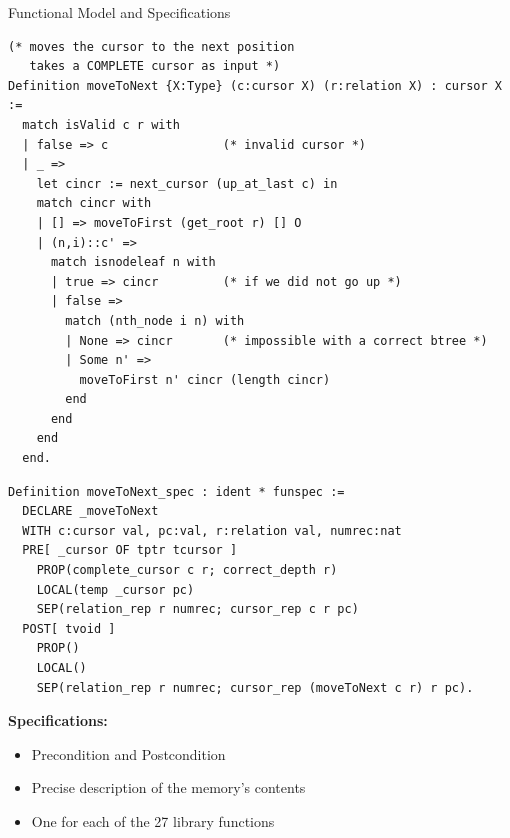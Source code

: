 \documentclass[usenames,dvipsnames]{beamer}
\def\sublock#1{\textbf{#1:}\\\vspace{0.5cm}}
\def\subsep{\vspace{1cm}}
\begin{document}
\begin{frame}[fragile]
\begin{columns}[T]
\begin{column}{.5\textwidth}
\begin{block}{Functional Model and Specifications}
  \vspace{-2cm}
    \setlength{\columnsep}{5cm}
  \begin{multicols}{2}
    \begin{lstlisting}[language=Coq,basicstyle=\scriptsize]
(* moves the cursor to the next position
   takes a COMPLETE cursor as input *)
Definition moveToNext {X:Type} (c:cursor X) (r:relation X) : cursor X :=
  match isValid c r with
  | false => c                (* invalid cursor *)
  | _ =>
    let cincr := next_cursor (up_at_last c) in
    match cincr with
    | [] => moveToFirst (get_root r) [] O 
    | (n,i)::c' =>
      match isnodeleaf n with
      | true => cincr         (* if we did not go up *)
      | false =>
        match (nth_node i n) with
        | None => cincr       (* impossible with a correct btree *)
        | Some n' =>
          moveToFirst n' cincr (length cincr)
        end
      end
    end
  end.
    \end{lstlisting}
    \vfill\null
    \columnbreak

    \begin{lstlisting}[language=Coq,basicstyle=\scriptsize]
Definition moveToNext_spec : ident * funspec :=
  DECLARE _moveToNext
  WITH c:cursor val, pc:val, r:relation val, numrec:nat
  PRE[ _cursor OF tptr tcursor ]
    PROP(complete_cursor c r; correct_depth r)
    LOCAL(temp _cursor pc)
    SEP(relation_rep r numrec; cursor_rep c r pc)
  POST[ tvoid ]
    PROP()
    LOCAL()
    SEP(relation_rep r numrec; cursor_rep (moveToNext c r) r pc).
    \end{lstlisting}
    \subsep
    
    \sublock{Specifications}
    \begin{itemize}
    \item Precondition and Postcondition
    \item Precise description of the memory's contents
    \item One for each of the 27 library functions
    \end{itemize}
  \end{multicols}
\end{block}
\end{column}


\end{columns}
\end{frame}
\end{document}

